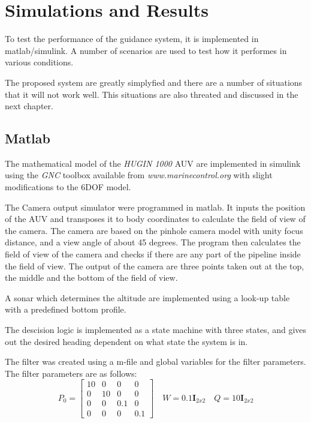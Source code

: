 \chapter{Simulations and Results}
	\label{ch3}
	To test the performance of the guidance system, it is implemented in matlab/simulink. A number of
	scenarios are used to test how it performes in various conditions.

	The proposed system are greatly simplyfied and there are a number of situations that it will not work
	well. This situations are also threated and discussed in the next chapter. 
	

\section{Matlab}
	The mathematical model of the \textit{HUGIN 1000} AUV are implemented in simulink using the
	\textit{GNC} toolbox available from \textit{www.marinecontrol.org} with slight modifications to the
	6DOF model.

	The Camera output simulator were programmed in matlab. It inputs the position of the AUV and
	transposes it to body coordinates to calculate the field of view of the camera. The camera are based
	on the pinhole camera model with unity focus distance, and a view angle of about 45 degrees. The
	program then calculates the field of view of the camera and checks if there are any part of the
	pipeline inside the field of view. The output of the camera are three points taken out at the top, the
	middle and the bottom of the field of view.

	A sonar which determines the altitude are implemented using a look-up table with a predefined bottom
	profile.

	The descision logic is implemented as a state machine with three states, and gives out the 
	desired heading dependent on what state the system is in.

	The filter was created using a m-file and global variables for the filter parameters. The filter
	parameters are as follows:
	\begin{equation}
		P_0 = \left [ \begin{matrix}
				10 & 0 & 0 & 0 \\
				0 & 10 & 0 & 0 \\
				0 & 0 & 0.1 & 0 \\
				0 & 0 & 0 & 0.1
				\end{matrix} \right] \quad
		W = 0.1 \mathbf{I}_{2x2} \quad Q = 10 \mathbf{I}_{2x2} 
	\end{equation}

